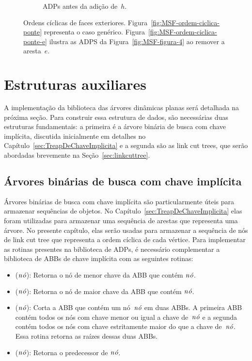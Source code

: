 \begin{figure}[htb]
\begin{subfigure}{.45\textwidth}
\scalebox{.6}{

}
\caption{ADPs antes da adição de~$h$.}
\label{fig:MSF-adiciona-ponte-3}
\end{subfigure}
	\caption{Ordens cíclicas de faces exteriores. Figura~\ref{fig:MSF-ordem-ciclica-ponte} representa o caso genérico. Figura~\ref{fig:MSF-ordem-ciclica-ponte-e} ilustra as ADPS da Figura~\ref{fig:MSF-figura-4} ao remover a aresta~$e$.}
\end{figure}



\section{Estruturas auxiliares}

A implementação da biblioteca das árvores dinâmicas planas será detalhada na próxima seção.
Para construir essa estrutura de dados, são necessárias duas estruturas fundamentais: a primeira é a árvore binária de busca com chave implícita, discutida inicialmente em detalhes no Capítulo~\ref{sec:TreapDeChaveImplicita} e a segunda são as link cut trees, que serão abordadas brevemente na Seção~\ref{sec:linkcuttree}.

\subsection{Árvores binárias de busca com chave implícita}

Árvores binárias de busca com chave implícita são particularmente úteis para armazenar sequências de objetos.
No Capítulo~\ref{sec:TreapDeChaveImplicita} elas foram utilizadas para armazenar uma sequência de arestas que representa uma árvore.
No presente capítulo, elas serão usadas para armazenar a sequência de nós de link cut tree que representa a ordem cíclica de cada vértice.
Para implementar as rotinas presentes na biblioteca de ADPs, é necessário complementar a biblioteca de ABBs de chave implícita com as seguintes rotinas:
\begin{itemize}
\item \treapFirst($\mathit{n\acute{o}}$): Retorna o nó de menor chave da ABB que contém $\mathit{n\acute{o}}$.
\item \treapLast($\mathit{n\acute{o}}$): Retorna o nó de maior chave da ABB que contém $\mathit{n\acute{o}}$.
\item \treapSplitRight($\mathit{n\acute{o}}$): Corta a ABB que contém um nó~$\mathit{n\acute{o}}$ em duas ABBs. A primeira ABB contém todos os nós com chave menor ou igual a chave de~$\mathit{n\acute{o}}$ e a segunda contém todos os nós com chave estritamente maior do que a chave de~$\mathit{n\acute{o}}$. Essa rotina retorna as raízes dessas duas ABBs.
\item \treapPredecessor($\mathit{n\acute{o}}$): Retorna o predecessor de $\mathit{n\acute{o}}$.
\end{itemize}

